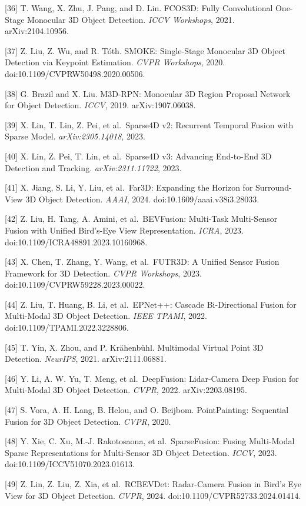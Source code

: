 {[}36{]} T. Wang, X. Zhu, J. Pang, and D. Lin. FCOS3D: Fully Convolutional One-Stage Monocular 3D Object Detection. \emph{ICCV Workshops}, 2021. arXiv:2104.10956.

{[}37{]} Z. Liu, Z. Wu, and R. Tóth. SMOKE: Single-Stage Monocular 3D Object Detection via Keypoint Estimation. \emph{CVPR Workshops}, 2020. doi:10.1109/CVPRW50498.2020.00506.

{[}38{]} G. Brazil and X. Liu. M3D-RPN: Monocular 3D Region Proposal Network for Object Detection. \emph{ICCV}, 2019. arXiv:1907.06038.

{[}39{]} X. Lin, T. Lin, Z. Pei, et al.~Sparse4D v2: Recurrent Temporal Fusion with Sparse Model. \emph{arXiv:2305.14018}, 2023.

{[}40{]} X. Lin, Z. Pei, T. Lin, et al.~Sparse4D v3: Advancing End-to-End 3D Detection and Tracking. \emph{arXiv:2311.11722}, 2023.

{[}41{]} X. Jiang, S. Li, Y. Liu, et al.~Far3D: Expanding the Horizon for Surround-View 3D Object Detection. \emph{AAAI}, 2024. doi:10.1609/aaai.v38i3.28033.

{[}42{]} Z. Liu, H. Tang, A. Amini, et al.~BEVFusion: Multi-Task Multi-Sensor Fusion with Unified Bird's-Eye View Representation. \emph{ICRA}, 2023. doi:10.1109/ICRA48891.2023.10160968.

{[}43{]} X. Chen, T. Zhang, Y. Wang, et al.~FUTR3D: A Unified Sensor Fusion Framework for 3D Detection. \emph{CVPR Workshops}, 2023. doi:10.1109/CVPRW59228.2023.00022.

{[}44{]} Z. Liu, T. Huang, B. Li, et al.~EPNet++: Cascade Bi-Directional Fusion for Multi-Modal 3D Object Detection. \emph{IEEE TPAMI}, 2022. doi:10.1109/TPAMI.2022.3228806.

{[}45{]} T. Yin, X. Zhou, and P. Krähenbühl. Multimodal Virtual Point 3D Detection. \emph{NeurIPS}, 2021. arXiv:2111.06881.

{[}46{]} Y. Li, A. W. Yu, T. Meng, et al.~DeepFusion: Lidar-Camera Deep Fusion for Multi-Modal 3D Object Detection. \emph{CVPR}, 2022. arXiv:2203.08195.

{[}47{]} S. Vora, A. H. Lang, B. Helou, and O. Beijbom. PointPainting: Sequential Fusion for 3D Object Detection. \emph{CVPR}, 2020.

{[}48{]} Y. Xie, C. Xu, M.-J. Rakotosaona, et al.~SparseFusion: Fusing Multi-Modal Sparse Representations for Multi-Sensor 3D Object Detection. \emph{ICCV}, 2023. doi:10.1109/ICCV51070.2023.01613.

{[}49{]} Z. Lin, Z. Liu, Z. Xia, et al.~RCBEVDet: Radar-Camera Fusion in Bird's Eye View for 3D Object Detection. \emph{CVPR}, 2024. doi:10.1109/CVPR52733.2024.01414.

